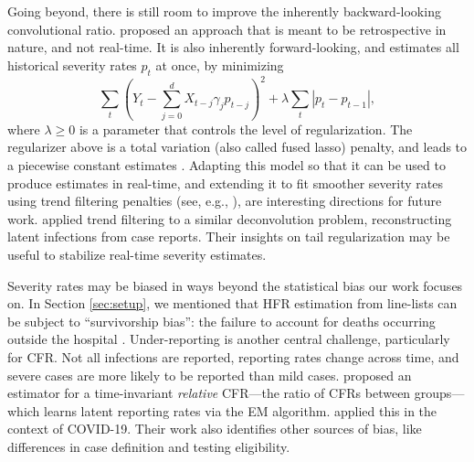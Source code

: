 \documentclass{article}
\renewcommand{\hat}{\widehat} %
\begin{document}
Going beyond, there is still room to improve the inherently backward-looking
convolutional ratio. \citet{fusedlasso} proposed an approach that is meant to be
retrospective in nature, and not real-time. It is also inherently
forward-looking, and estimates all historical severity rates $p_t$ at once, by
minimizing  
\[
\sum_t (Y_t - \sum_{j=0}^d X_{t-j}\gamma_j p_{t-j})^2 + 
\lambda \sum_t |p_t - p_{t-1}|,
\]
where $\lambda \geq 0$ is a parameter that controls the level of
regularization. The regularizer above is a total variation (also called fused
lasso) penalty, and leads to a piecewise constant estimates
\smash{$\hat{p}_t$}. Adapting this model so that it can be used to produce
estimates in real-time, and extending it to fit smoother severity rates using
trend filtering penalties (see, e.g., \citealp{Tibshirani2014}), are interesting
directions for future work. \citet{Jahja2022} applied trend filtering to a
similar deconvolution problem, reconstructing latent infections from case
reports. Their insights on tail regularization may be useful to stabilize
real-time severity estimates.



Severity rates may be biased in ways beyond the statistical bias our work
focuses on. In Section \ref{sec:setup}, we mentioned that HFR estimation from
line-lists can be subject to ``survivorship bias'': the failure to account for 
deaths occurring outside the hospital \citep{lipsitch2015potential}.
Under-reporting is another central challenge, particularly for CFR. Not all
infections are reported, reporting rates change across time, and severe cases
are more likely to be reported than mild cases. \citet{reich2012estimating}
proposed an estimator for a time-invariant \emph{relative} CFR---the ratio of
CFRs between groups---which learns latent reporting rates via the EM
algorithm. \citet{anastasios} applied this in the context of COVID-19. Their
work also identifies other sources of bias, like differences in case definition
and testing eligibility.  
\end{document}
